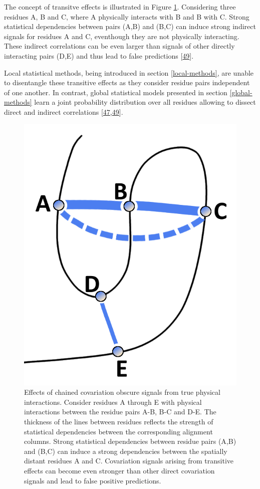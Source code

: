 \documentclass[12pt,a4paper,twoside]{book}
\theoremstyle{definition}
\theoremstyle{definition}
\theoremstyle{remark}
\begin{document}
The concept of transitve effects is illustrated in Figure
\ref{fig:transitive-effect}. Considering three residues A, B and C,
where A physically interacts with B and B with C. Strong statistical
dependencies between pairs (A,B) and (B,C) can induce strong indirect
signals for residues A and C, eventhough they are not physically
interacting. These indirect correlations can be even larger than signals
of other directly interacting pairs (D,E) and thus lead to false
predictions {[}\protect\hyperlink{ref-Burger2010}{49}{]}.

Local statistical methods, being introduced in section
\ref{local-methods}, are unable to disentangle these transitive effects
as they consider residue pairs independent of one another. In contrast,
global statistical models presented in section \ref{global-methods}
learn a joint probability distribution over all residues allowing to
dissect direct and indirect correlations
{[}\protect\hyperlink{ref-Weigt2009}{47},\protect\hyperlink{ref-Burger2010}{49}{]}.












\begin{figure}

{\centering \includegraphics[width=0.25\linewidth]{img/intro/transitive_effects} 

}

\caption{Effects of chained covariation obscure
signals from true physical interactions. Consider residues A through E
with physical interactions between the residue pairs A-B, B-C and D-E.
The thickness of the lines between residues reflects the strength of
statistical dependencies between the corresponding alignment columns.
Strong statistical dependencies between residue pairs (A,B) and (B,C)
can induce a strong dependencies between the spatially distant residues
A and C. Covariation signals arising from transitive effects can become
even stronger than other direct covariation signals and lead to false
positive predictions.}\label{fig:transitive-effect}
\end{figure}
\end{document}
